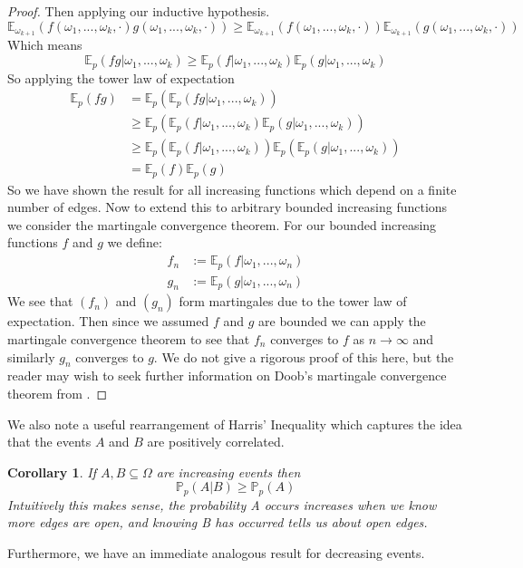 \documentclass[a4paper,11pt]{article}
\newtheorem{corollary}[theorem]{Corollary}
\theoremstyle{definition}
\newcommand{\prob}{\mathbb{P}_p}
\newcommand{\expp}{\mathbb{E}_p}
\begin{document}
\begin{proof}
	Then applying our inductive hypothesis.
	$$\mathbb{E}_{\omega_{k+1}}(f(\omega_1,...,\omega_k,\cdot)g(\omega_1,...,\omega_k,\cdot))
	\geq \mathbb{E}_{\omega_{k+1}}(f(\omega_1,...,\omega_k,\cdot))\mathbb{E}_{\omega_{k+1}}(g(\omega_1,...,\omega_k,\cdot))$$
	Which means
	$$ \mathbb{E}_p(fg|\omega_1,...,\omega_k) \geq \mathbb{E}_p(f|\omega_1,...,\omega_k)\mathbb{E}_p(g|\omega_1,...,\omega_k)$$
	So applying the tower law of expectation 
	\begin{align*}
		\expp(fg) &= \expp(\expp(fg|\omega_1,...,\omega_k))\\
		&\geq \expp(\expp(f|\omega_1,...,\omega_k)\expp(g|\omega_1,...,\omega_k))\\
		&\geq \expp(\expp(f|\omega_1,...,\omega_k))\expp(\expp(g|\omega_1,...,\omega_k))\\
		&= \expp(f)\expp(g)
	\end{align*}
	So we have shown the result for all increasing functions which depend on a finite number of edges.
	Now to extend this to arbitrary bounded increasing functions we consider the martingale convergence theorem.
	For our bounded increasing functions $f$ and $g$ we define:
	\begin{align*}
		f_n &:= \expp(f | \omega_1,...,\omega_n)\\
		g_n &:= \expp(g | \omega_1,...,\omega_n)
	\end{align*}
	We see that $(f_n)$ and $(g_n)$ form martingales due to the tower law of expectation.
	Then since we assumed $f$ and $g$ are bounded we can apply the martingale convergence theorem to see that $f_n$ converges to $f$  as $n \rightarrow \infty$ and similarly $g_n$ converges to $g$.
	We do not give a rigorous proof of this here, but the reader may wish to seek further information on Doob's martingale convergence theorem from \cite{williams_1991}.
	

\end{proof}
We also note a useful rearrangement of Harris' Inequality which captures the idea that the events $A$ and $B$ are positively correlated.
\begin{corollary}
	If $A, B \subseteq \Omega$ are increasing events then 
	$$\prob(A|B) \geq \prob(A)$$
	Intuitively this makes sense, the probability A occurs increases when we know more edges are open, and knowing B has occurred tells us about open edges.
\end{corollary}

Furthermore, we have an immediate analogous result for decreasing events.
\end{document}

